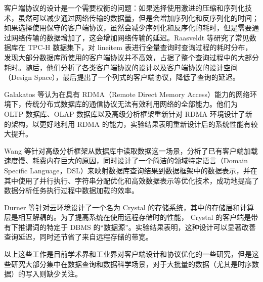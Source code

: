 客户端协议的设计是一个需要权衡的问题：如果选择使用激进的压缩和序列化技术，虽然可以减少通过网络传输的数据量，但是会增加序列化和反序列化的时间；如果选择使用保守的客户端协议，虽然会减少序列化和反序化的耗时，但是需要通过网络传输的数据增加了，这会增加网络传输的延迟。Raasveldt 等研究了常见数据库在 TPC-H 数据集\cite{poess2000new}下，对 lineitem 表进行全量查询时查询过程的耗时分布，发现大部分数据库所使用的客户端协议并不高效，占据了整个查询过程中的大部分耗时。随后，他们分析了各类客户端协议的设计以及客户端协议的设计空间（Design Space），最后提出了一个列式的客户端协议，降低了查询的延迟\cite{raasveldt2017don}。

Galakatos 等认为在具有 RDMA（Remote Direct Memory Access）\cite{recio2007remote}能力的网络环境下，传统分布式数据库的通信协议无法有效利用网络的全部能力。他们为 OLTP 数据库、OLAP 数据库以及高级分析框架重新针对 RDMA 环境设计了新的架构，以更好地利用 RDMA 的能力，实验结果表明重新设计后的系统性能有较大提升\cite{galakatos2016end}。

Wang 等针对高级分析框架从数据库中读取数据这一场景，分析了已有客户端加载速度慢、耗费内存巨大的原因，同时设计了一个简洁的领域特定语言（Domain Specific Language，DSL）来映射数据库查询结果到数据框架中的数据表示，并在其中使用了并行执行、字符串分配优化和高效数据表示等优化技术，成功地提高了数据分析任务执行过程中数据加载的效率\cite{wang2022connectorx}。

Durner 等针对云环境设计了一个名为 Crystal 的存储系统，其中的存储层和计算层是相互解耦的。为了提高系统在使用远程存储时的性能， Crystal 的客户端是带有下推谓词的特定于 DBMS 的“数据源”。实验结果表明，这种设计可以显著改善查询延迟，同时还节省了来自远程存储的带宽\cite{durner2021crystal}。

以上这些工作是目前学术界和工业界对客户端设计和协议优化的一些研究，但是这些研究大部分集中在数据查询和数据科学场景，对于大批量的数据（尤其是时序数据）的写入则缺少关注。